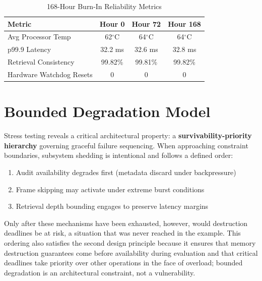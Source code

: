 \documentclass[conference]{IEEEtran}
\begin{document}
\begin{table}[htbp]
\caption{168-Hour Burn-In Reliability Metrics}
\begin{center}
\begin{tabular}{lccc}
\toprule
\textbf{Metric} & \textbf{Hour 0} & \textbf{Hour 72} & \textbf{Hour 168} \\
\midrule
Avg Processor Temp & 62$^\circ$C & 64$^\circ$C & 64$^\circ$C \\
p99.9 Latency & 32.2 ms & 32.6 ms & 32.8 ms \\
Retrieval Consistency & 99.82\% & 99.81\% & 99.82\% \\
Hardware Watchdog Resets & 0 & 0 & 0 \\
\bottomrule
\end{tabular}
\end{center}
\label{tab:stability}
\end{table}

\section{Bounded Degradation Model}

Stress testing reveals a critical architectural property: a \textbf{survivability-priority hierarchy} governing graceful failure sequencing. When approaching constraint boundaries, subsystem shedding is intentional and follows a defined order:
\begin{enumerate}
    \item Audit availability degrades first (metadata discard under backpressure)
    \item Frame skipping may activate under extreme burst conditions
    \item Retrieval depth bounding engages to preserve latency margins
\end{enumerate}
Only after these mechanisms have been exhausted, however, would destruction deadlines be at risk, a situation that was never reached in the example. This ordering also satisfies the second design principle because it ensures that memory destruction guarantees come before availability during evaluation and that critical deadlines take priority over other operations in the face of overload; bounded degradation is an architectural constraint, not a vulnerability.

\end{document}
